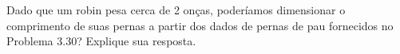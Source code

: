 Dado que um robin pesa cerca de 2 onças, poderíamos dimensionar o comprimento de suas pernas a partir dos dados de pernas de pau fornecidos no Problema 3.30? Explique sua resposta.

